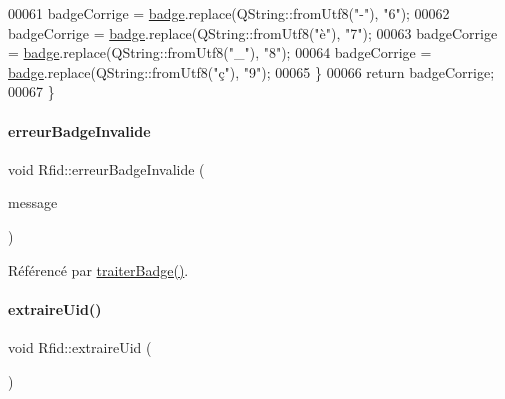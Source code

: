 \begin{DoxyCode}
00061         badgeCorrige = \hyperlink{class_rfid_ac634cd26ffbe1c6da3967dc4af53b734}{badge}.replace(QString::fromUtf8(\textcolor{stringliteral}{"-"}), \textcolor{stringliteral}{"6"});
00062         badgeCorrige = \hyperlink{class_rfid_ac634cd26ffbe1c6da3967dc4af53b734}{badge}.replace(QString::fromUtf8(\textcolor{stringliteral}{"è"}), \textcolor{stringliteral}{"7"});
00063         badgeCorrige = \hyperlink{class_rfid_ac634cd26ffbe1c6da3967dc4af53b734}{badge}.replace(QString::fromUtf8(\textcolor{stringliteral}{"\_"}), \textcolor{stringliteral}{"8"});
00064         badgeCorrige = \hyperlink{class_rfid_ac634cd26ffbe1c6da3967dc4af53b734}{badge}.replace(QString::fromUtf8(\textcolor{stringliteral}{"ç"}), \textcolor{stringliteral}{"9"});
00065     \}
00066     \textcolor{keywordflow}{return} badgeCorrige;
00067 \}
\end{DoxyCode}
\mbox{\label{class_rfid_a896a20a2fbe2ac7d842456a1161717cb}} 
\paragraph{\texorpdfstring{erreur\+Badge\+Invalide}{erreurBadgeInvalide}}
{\footnotesize\ttfamily void Rfid\+::erreur\+Badge\+Invalide (\begin{DoxyParamCaption}\item[{Q\+String}]{message }\end{DoxyParamCaption})\hspace{0.3cm}{\ttfamily [signal]}}



Référencé par \hyperlink{_rfid_8cpp_source_l00097}{traiter\+Badge()}.

\mbox{\label{class_rfid_a884e849f175045d78587e1e09a87cb00}} 
\paragraph{\texorpdfstring{extraire\+Uid()}{extraireUid()}}
{\footnotesize\ttfamily void Rfid\+::extraire\+Uid (\begin{DoxyParamCaption}{ }\end{DoxyParamCaption})\hspace{0.3cm}{\ttfamily [private]}}



